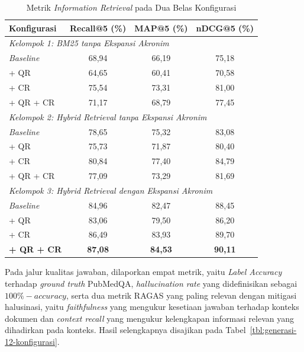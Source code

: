 \begin{table}[H]
\centering
\small
\setlength{\tabcolsep}{6pt}
\caption{Metrik \textit{Information Retrieval} pada Dua Belas Konfigurasi}
\label{tbl:retrieval-12-konfigurasi}
\begin{tabular}{lccc}
\toprule
\textbf{Konfigurasi} & \textbf{Recall@5 (\%)} & \textbf{MAP@5 (\%)} & \textbf{nDCG@5 (\%)} \\
\midrule
\multicolumn{4}{l}{\textit{Kelompok 1: BM25 tanpa Ekspansi Akronim}} \\
\quad \textit{Baseline}      & 68{,}94 & 66{,}19 & 75{,}18 \\
\quad + QR                   & 64{,}65 & 60{,}41 & 70{,}58 \\
\quad + CR                   & 75{,}54 & 73{,}31 & 81{,}00 \\
\quad + QR + CR              & 71{,}17 & 68{,}79 & 77{,}45 \\
\midrule
\multicolumn{4}{l}{\textit{Kelompok 2: Hybrid Retrieval tanpa Ekspansi Akronim}} \\
\quad \textit{Baseline}      & 78{,}65 & 75{,}32 & 83{,}08 \\
\quad + QR                   & 75{,}73 & 71{,}87 & 80{,}40 \\
\quad + CR                   & 80{,}84 & 77{,}40 & 84{,}79 \\
\quad + QR + CR              & 77{,}09 & 73{,}29 & 81{,}69 \\
\midrule
\multicolumn{4}{l}{\textit{Kelompok 3: Hybrid Retrieval dengan Ekspansi Akronim}} \\
\quad \textit{Baseline}      & 84{,}96 & 82{,}47 & 88{,}45 \\
\quad + QR                   & 83{,}06 & 79{,}50 & 86{,}20 \\
\quad + CR                   & 86{,}49 & 83{,}93 & 89{,}70 \\
\quad \textbf{+ QR + CR}     & \textbf{87{,}08} & \textbf{84{,}53} & \textbf{90{,}11} \\
\bottomrule
\end{tabular}
\end{table}

Pada jalur kualitas jawaban, dilaporkan empat metrik, yaitu \textit{Label Accuracy} terhadap \textit{ground truth} PubMedQA, \textit{hallucination rate} yang didefinisikan sebagai $100\% - \textit{accuracy}$, serta dua metrik RAGAS yang paling relevan dengan mitigasi halusinasi, yaitu \textit{faithfulness} yang mengukur kesetiaan jawaban terhadap konteks dokumen dan \textit{context recall} yang mengukur kelengkapan informasi relevan yang dihadirkan pada konteks. Hasil selengkapnya disajikan pada Tabel~\ref{tbl:generasi-12-konfigurasi}.

